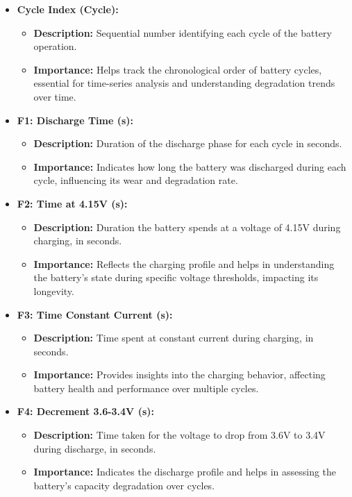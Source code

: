 \begin{itemize}
    \item \textbf{Cycle Index (Cycle):} 
    \begin{itemize}
        \item \textbf{Description:} Sequential number identifying each cycle of the battery operation.
        \item \textbf{Importance:} Helps track the chronological order of battery cycles, essential for time-series analysis and understanding degradation trends over time.
    \end{itemize}
    \item \textbf{F1: Discharge Time (s):} 
    \begin{itemize}
        \item \textbf{Description:} Duration of the discharge phase for each cycle in seconds.
        \item \textbf{Importance:} Indicates how long the battery was discharged during each cycle, influencing its wear and degradation rate.
    \end{itemize}
    \item \textbf{F2: Time at 4.15V (s):} 
    \begin{itemize}
        \item \textbf{Description:} Duration the battery spends at a voltage of 4.15V during charging, in seconds.
        \item \textbf{Importance:} Reflects the charging profile and helps in understanding the battery's state during specific voltage thresholds, impacting its longevity.
    \end{itemize}
    \item \textbf{F3: Time Constant Current (s):} 
    \begin{itemize}
        \item \textbf{Description:} Time spent at constant current during charging, in seconds.
        \item \textbf{Importance:} Provides insights into the charging behavior, affecting battery health and performance over multiple cycles.
    \end{itemize}
    \item \textbf{F4: Decrement 3.6-3.4V (s):} 
    \begin{itemize}
        \item \textbf{Description:} Time taken for the voltage to drop from 3.6V to 3.4V during discharge, in seconds.
        \item \textbf{Importance:} Indicates the discharge profile and helps in assessing the battery's capacity degradation over cycles.

\end{itemize}
\end{itemize}
